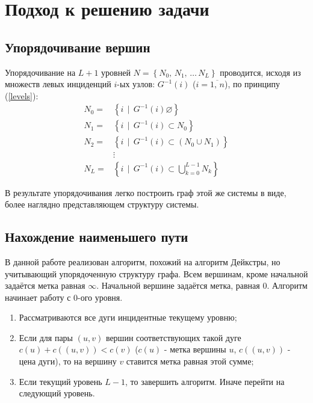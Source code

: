 	\section{Подход к решению задачи}
	
	\subsection{Упорядочивание вершин}	
	
	Упорядочивание на $L+1$ уровней $N = \left\{N_0,\,N_1,\,\dots\,N_L\right\}$ проводится, исходя из множеств левых инциденций $i$-ых узлов: $G^{-1}(i)$ ($i=\overline{1,\,n}$), по принципу (\ref{levels}):
	\begin{equation}
		\begin{aligned}
			N_0 = &\left\{ i\,\mid\, G^{-1}(i) \varnothing \right\} \\
			N_1 = &\left\{ i\,\mid\, G^{-1}(i) \subset N_0 \right\} \\
			N_2 = &\left\{ i\,\mid\, G^{-1}(i) \subset \left(N_0\cup N_1\right) \right\} \\
			&\vdots \\
			N_L = &\left\{ i\,\mid\, G^{-1}(i) \subset \bigcup_{k=0}^{L-1} N_k \right\}
		\end{aligned}
		\label{levels}
	\end{equation}
	
	В результате упорядочивания легко построить граф этой же системы в виде, более наглядно представляющем структуру системы. 
	
	\subsection{Нахождение наименьшего пути}
	
	В данной работе реализован алгоритм, похожий на алгоритм Дейкстры, но учитывающий упорядоченную структуру графа. Всем вершинам, кроме начальной задаётся метка равная $\infty$. Начальной вершине задаётся метка, равная 0. Алгоритм начинает работу с $0$-ого уровня.
	\begin{enumerate}
		\item Рассматриваются все дуги инцидентные текущему уровню;
		\item Если для пары $(u, v)$ вершин соответствующих такой дуге $c(u) + c((u, v)) < c(v)$ ($c(u)$ - метка вершины $u$, $c((u, v))$ - цена дуги), то на вершину $v$ ставится метка равная этой сумме;
		\item Если текущий уровень $L-1$, то завершить алгоритм. Иначе перейти на следующий уровень. 
	\end{enumerate}
	
